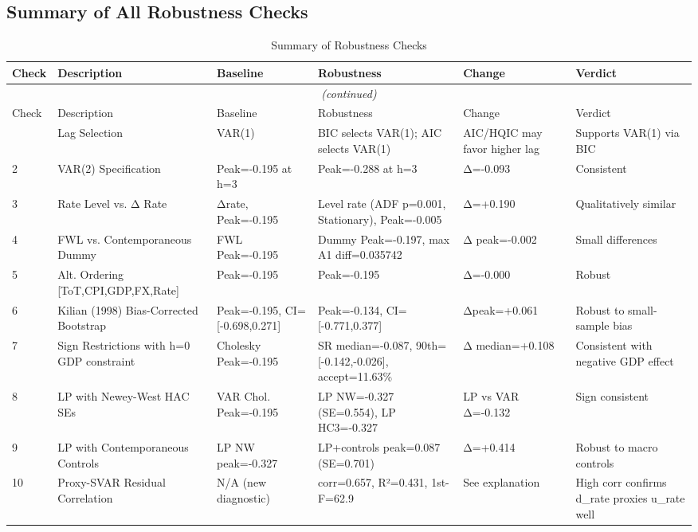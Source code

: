\subsection{Summary of All Robustness Checks}
\label{sec:robustsum}
\begin{small}
\begin{longtable}{llp{3.2cm}p{3.2cm}p{1.5cm}p{3cm}}
\caption{Summary of Robustness Checks}\label{tab:robustness_summary}\\
\toprule
Check & Description & Baseline & Robustness & Change & Verdict \\
\midrule
\endfirsthead
\multicolumn{6}{c}{\textit{(continued)}}\\
\toprule
Check & Description & Baseline & Robustness & Change & Verdict \\
\midrule
\endhead
\bottomrule
\endlastfoot
1 & Lag Selection & VAR(1) & BIC selects VAR(1); AIC selects VAR(1) & AIC/HQIC may favor higher lag & Supports VAR(1) via BIC \\
2 & VAR(2) Specification & Peak=-0.195 at h=3 & Peak=-0.288 at h=3 & Δ=-0.093 & Consistent \\
3 & Rate Level vs. Δ Rate & Δrate, Peak=-0.195 & Level rate (ADF p=0.001, Stationary), Peak=-0.005 & Δ=+0.190 & Qualitatively similar \\
4 & FWL vs. Contemporaneous Dummy & FWL Peak=-0.195 & Dummy Peak=-0.197, max A1 diff=0.035742 & Δ peak=-0.002 & Small differences \\
5 & Alt. Ordering [ToT,CPI,GDP,FX,Rate] & Peak=-0.195 & Peak=-0.195 & Δ=-0.000 & Robust \\
6 & Kilian (1998) Bias-Corrected Bootstrap & Peak=-0.195, CI=[-0.698,0.271] & Peak=-0.134, CI=[-0.771,0.377] & Δpeak=+0.061 & Robust to small-sample bias \\
7 & Sign Restrictions with h=0 GDP constraint & Cholesky Peak=-0.195 & SR median=-0.087, 90th=[-0.142,-0.026], accept=11.63\% & Δ median=+0.108 & Consistent with negative GDP effect \\
8 & LP with Newey-West HAC SEs & VAR Chol. Peak=-0.195 & LP NW=-0.327 (SE=0.554), LP HC3=-0.327 & LP vs VAR Δ=-0.132 & Sign consistent \\
9 & LP with Contemporaneous Controls & LP NW peak=-0.327 & LP+controls peak=0.087 (SE=0.701) & Δ=+0.414 & Robust to macro controls \\
10 & Proxy-SVAR Residual Correlation & N/A (new diagnostic) & corr=0.657, R²=0.431, 1st-F=62.9 & See explanation & High corr confirms d\_rate proxies u\_rate well \\

\end{longtable}
\end{small}
